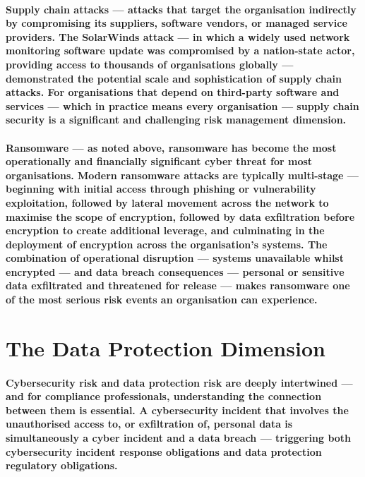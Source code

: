 \paragraph{\textbf{Supply chain attacks} — attacks that target the organisation indirectly by compromising its suppliers, software vendors, or managed service providers. The SolarWinds attack — in which a widely used network monitoring software update was compromised by a nation-state actor, providing access to thousands of organisations globally — demonstrated the potential scale and sophistication of supply chain attacks. For organisations that depend on third-party software and services — which in practice means every organisation — supply chain security is a significant and challenging risk management dimension.}
\paragraph{\textbf{Ransomware} — as noted above, ransomware has become the most operationally and financially significant cyber threat for most organisations. Modern ransomware attacks are typically multi-stage — beginning with initial access through phishing or vulnerability exploitation, followed by lateral movement across the network to maximise the scope of encryption, followed by data exfiltration before encryption to create additional leverage, and culminating in the deployment of encryption across the organisation's systems. The combination of operational disruption — systems unavailable whilst encrypted — and data breach consequences — personal or sensitive data exfiltrated and threatened for release — makes ransomware one of the most serious risk events an organisation can experience.}

\section{The Data Protection Dimension}
\paragraph{Cybersecurity risk and data protection risk are deeply intertwined — and for compliance professionals, understanding the connection between them is essential. A cybersecurity incident that involves the unauthorised access to, or exfiltration of, personal data is simultaneously a cyber incident and a data breach — triggering both cybersecurity incident response obligations and data protection regulatory obligations.}

